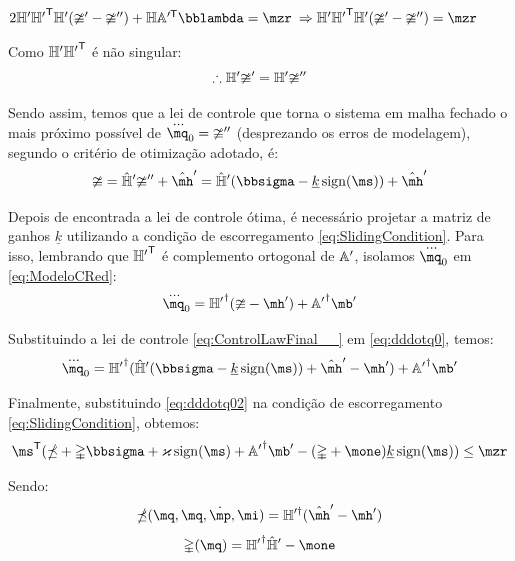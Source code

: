 \documentclass[a4paper,11pt,brazil,fleqn]{article}
\begin{document}
\begin{itemize}
$ 2 \mH' {\mH'}^\msT \mH' (\mup' - \mup'') + \mH \mA'^\msT \mlambda = \mzr $
$ \Rightarrow  \mH' {\mH'}^\msT \mH' (\mup' - \mup'')  = \mzr $

Como $\mathbb{H}' {\mathbb{H}'}^{\mathsf{T}}$ \'e n\~ao singular:
\begin{equation} \label{eq:OptimizationSol2__}
\therefore \mathbb{H}' \mathbb{\upsilon}'  = \mathbb{H}' \mathbb{\upsilon}''
\end{equation}

Sendo assim, temos que a lei de controle que torna o sistema em malha fechado o mais pr\'oximo poss\'ivel de $\dddot{\mq}_0 = \mup''$ (desprezando os erros de modelagem), segundo o crit\'erio de otimiza\c{c}\~ao adotado, \'e:
\begin{equation} \label{eq:ControlLawFinal__}
\mup = \hat{\mH}' \mup'' + \hat{\mh}' = \hat{\mH}'(\msigma - \underline{k} \sign(\ms)) + \hat{\mh}'
\end{equation}

Depois de encontrada a lei de controle \'otima, \'e necess\'ario projetar a matriz de ganhos $\underline{k}$ utilizando a condi\c{c}\~ao de escorregamento \eqref{eq:SlidingCondition}. Para isso, lembrando que ${\mathbb{H}'}^{\mathsf{T}}$ \'e complemento ortogonal de $\mathbb{A}'$, isolamos $\dddot{\mq}_0$ em \eqref{eq:ModeloCRed}:
\begin{equation} \label{eq:dddotq0}
\dddot{\mq}_0 = {\mH'}^\msP (\mup - \mh') + {\mA'}^\msP \mb'
\end{equation}

Substituindo a lei de controle \eqref{eq:ControlLawFinal__} em \eqref{eq:dddotq0}, temos:
\begin{equation} \label{eq:dddotq02}
\dddot{\mq}_0 = {\mH'}^\msP ( \hat{\mH}'(\msigma - \underline{k} \sign(\ms)) + \hat{\mh}' - \mh') + {\mA'}^\msP \mb'
\end{equation}

Finalmente, substituindo \eqref{eq:dddotq02} na condi\c{c}\~ao de escorregamento \eqref{eq:SlidingCondition}, obtemos:
\begin{equation} \label{eq:SlidingConditionRed}
\ms^\msT ( \mdelta + \mDelta \msigma  + \varkappa \sign(\ms) + {\mA'}^\msP \mb' - (\mDelta + \mone) \underline{k} \sign(\ms) ) \leq \mzr
\end{equation}

Sendo:
\begin{equation}
\mdelta(\mq,\mq,\dot{\mp},\mi) = {\mH}'^\msP (\hat{\mh}' - \mh')
\end{equation}
\begin{equation}
\mDelta(\mq) = {\mH'}^\msP \hat{\mH}' - \mone
\end{equation}


\end{itemize}
\end{document}
